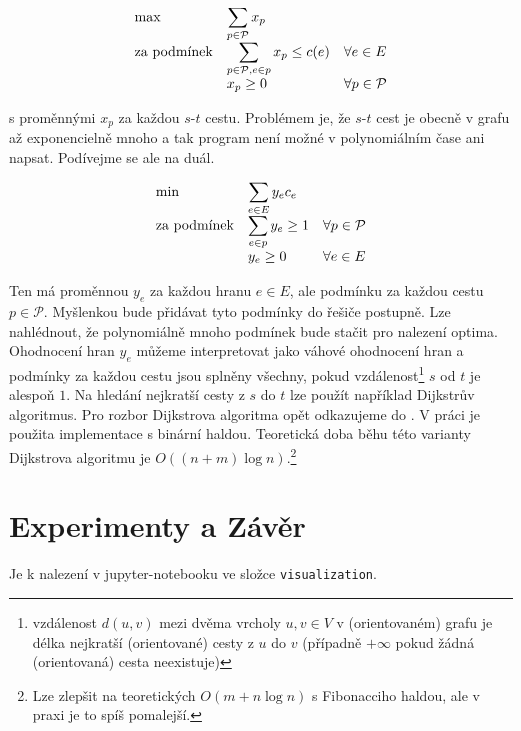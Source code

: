 \documentclass{article}
\theoremstyle{plain}
\theoremstyle{definition}
\begin{document}
\begin{equation}\label{exp_lp}
\begin{array}{ll@{}ll}
\text{max} & \displaystyle\sum_{p\in\mathcal{P}}x_p  &\\
\text{za podmínek}& \displaystyle\sum_{p\in\mathcal{P},e\in p} x_p \leq c(e)  & & \forall e \in E\\
& x_p\geq 0 & & \forall p \in \mathcal{P}
\end{array}
\end{equation}

s proměnnými $x_p$ za každou $s$-$t$ cestu. Problémem je, že $s$-$t$ cest je obecně v grafu až exponencielně mnoho a tak program není možné v polynomiálním čase ani napsat. Podívejme se ale na duál.

\begin{equation}\label{dual_exp}
\begin{array}{ll@{}ll}
\text{min} & \displaystyle\sum_{e\in E}y_ec_e &\\
\text{za podmínek}& \displaystyle \sum_{e\in p}y_e \geq 1 & & \forall p\in\mathcal{P}\\
&y_e \geq 0& & \forall e \in E
\end{array}
\end{equation}

Ten má proměnnou $y_e$ za každou hranu $e\in E$, ale podmínku za každou cestu $p\in \mathcal{P}$. Myšlenkou bude přidávat tyto podmínky do řešiče postupně. Lze nahlédnout, že polynomiálně mnoho podmínek bude stačit pro nalezení optima. Ohodnocení hran $y_e$ můžeme interpretovat jako váhové ohodnocení hran a podmínky za každou cestu jsou splněny všechny, pokud vzdálenost\footnote{vzdálenost $d(u,v)$ mezi dvěma vrcholy $u,v\in V$ v (orientovaném) grafu je délka nejkratší (orientované) cesty z $u$ do $v$ (případně $+\infty$ pokud žádná (orientovaná) cesta neexistuje)} $s$ od $t$ je alespoň $1$. Na hledání nejkratší cesty z $s$ do $t$ lze použít například Dijkstrův algoritmus. Pro rozbor Dijkstrova algoritma opět odkazujeme do \cite{labyrint}. V práci je použita implementace s binární haldou. Teoretická doba běhu této varianty Dijkstrova algoritmu je $O((n+m)\log n)$.\footnote{Lze zlepšit na teoretických $O(m+n\log n)$ s Fibonacciho haldou, ale v praxi je to spíš pomalejší.}


\section{Experimenty a Závěr}
Je k nalezení v jupyter-notebooku ve složce {\tt visualization}.


\end{document}
